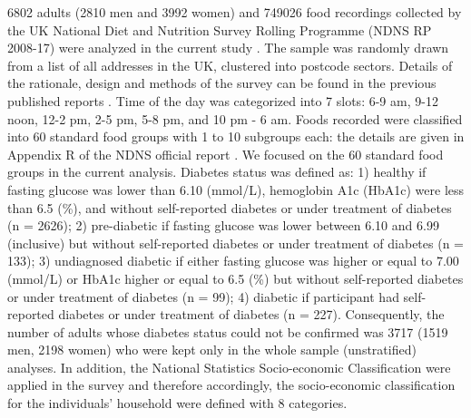 \documentclass{bmcart}
\begin{document}
6802 adults (2810 men and 3992 women) and 749026 food recordings collected by the UK National Diet and Nutrition Survey Rolling Programme (NDNS RP 2008-17) were analyzed in the current study \cite{MRCElsieWiddowsonLaboratory2018}. The sample was randomly drawn from a list of all addresses in the UK, clustered into postcode sectors. Details of the rationale, design and methods of the survey can be found in the previous published reports \cite{bates2014national,roberts2018national}. Time of the day was categorized into 7 slots: 6-9 am, 9-12 noon, 12-2 pm, 2-5 pm, 5-8 pm, and 10 pm - 6 am. Foods recorded were classified into 60 standard food groups with 1 to 10 subgroups each: the details are given in Appendix R of the NDNS official report \cite{NDNSdatabase2018}. We focused on the 60 standard food groups in the current analysis. Diabetes status was defined as: 1) healthy if fasting glucose was lower than 6.10 (mmol/L), hemoglobin A1c (HbA1c) were less than 6.5 (\%), and without self-reported diabetes or under treatment of diabetes (n = 2626); 2) pre-diabetic if fasting glucose was lower between 6.10 and 6.99 (inclusive) but without self-reported diabetes or under treatment of diabetes (n = 133); 3) undiagnosed diabetic if either fasting glucose was higher or equal to 7.00 (mmol/L) or HbA1c higher or equal to 6.5 (\%) but without self-reported diabetes or under treatment of diabetes (n = 99); 4) diabetic if participant had self-reported diabetes or under treatment of diabetes (n = 227). Consequently, the number of adults whose diabetes status could not be confirmed was 3717 (1519 men, 2198 women) who were kept only in the whole sample (unstratified) analyses. In addition, the National Statistics Socio-economic Classification \cite{rose2005national} were applied in the survey and therefore accordingly, the socio-economic classification for the individuals' household were defined with 8 categories. 
\end{document}
